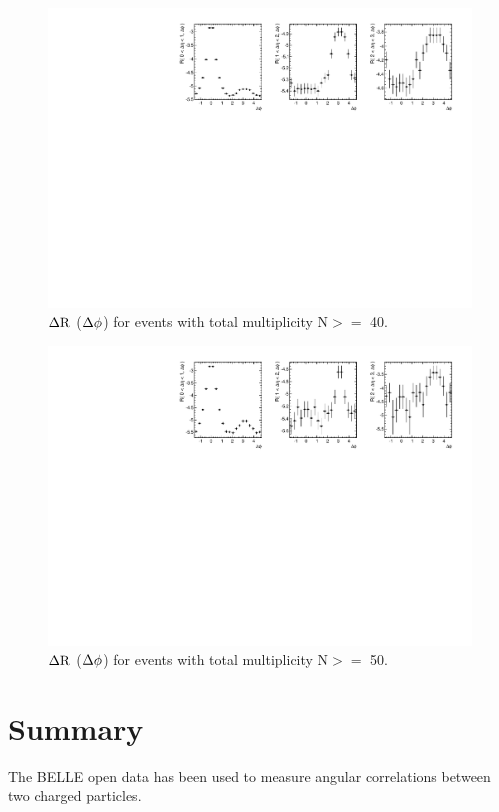 \documentclass[%
preprint,
 amsmath,amssymb,
 aps,
]{revtex4-1}
\begin{document}
\begin{figure}[!htb]
\begin{center}
\includegraphics[width=.95\textwidth]{figures/canvasProjection_isBelle1_mult40.pdf}
\caption{$\rm \Delta R$ ($\rm \Delta\phi$) for events with total multiplicity N$>=$ 40. }
\label{fig:ProjectionMult40} 
\end{center}
\end{figure}

\begin{figure}[!htb]
\begin{center}
\includegraphics[width=.95\textwidth]{figures/canvasProjection_isBelle1_mult50.pdf}
\caption{$\rm \Delta R$ ($\rm \Delta\phi$) for events with total multiplicity N$>=$ 50. }
\label{fig:ProjectionMult50} 
\end{center}
\end{figure}


\section{Summary}

The BELLE open data has been used to measure angular correlations between two charged particles. 
\end{document}
